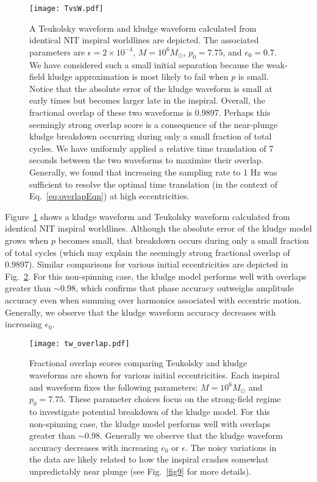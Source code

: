 \documentclass[aps,prd,twocolumn,showpacs,notitlepage,eqsecnum,
superscriptaddress,nofootinbib]{revtex4-1}
\begin{document}
\begin{figure}
\centering
  \vspace{0.2cm}
  \texttt{[image: TvsW.pdf]} 
   \caption{A Teukolsky waveform and kludge waveform calculated from identical NIT inspiral worldlines are depicted. The associated parameters are $\epsilon = 2\times 10^{-4}$, $M = 10^6 M_\odot$, $p_0 = 7.75$, and $e_0 = 0.7$. We have considered such a small initial separation because the weak-field kludge approximation is most likely to fail when $p$ is small. Notice that the absolute error of the kludge waveform is small at early times but becomes larger late in the inspiral. Overall, the fractional overlap of these two waveforms is 0.9897. Perhaps this seemingly strong overlap score is a consequence of the near-plunge kludge breakdown occurring during only a small fraction of total cycles. We have uniformly applied a relative time translation of 7 seconds between the two waveforms to maximize their overlap. Generally, we found that increasing the sampling rate to 1 Hz was sufficient to resolve the optimal time translation (in the context of Eq.~\eqref{eq:overlapEqn}) at high eccentricities.}
  \label{fig:TvsW}
\end{figure}

Figure~\ref{fig:TvsW} shows a kludge waveform and Teukolsky waveform calculated from identical NIT inspiral worldlines. Although the absolute error of the kludge model grows when $p$ becomes small, that breakdown occurs during only a small fraction of total cycles (which may explain the seemingly strong fractional overlap of 0.9897). Similar comparisons for various initial eccentricities are depicted in Fig.~\ref{fig:tw_overlap}. For this non-spinning case, the kludge model performs well with overlaps greater than $\sim 0.98$, which confirms that phase accuracy outweighs amplitude accuracy even when summing over harmonics associated with eccentric motion. Generally, we observe that the kludge waveform accuracy decreases with increasing $e_0$.

\begin{figure}
\centering
  \vspace{0.2cm}
  \texttt{[image: tw\_overlap.pdf]} 
   \caption{Fractional overlap scores comparing Teukolsky and kludge waveforms are shown for various initial eccentricities. Each inspiral and waveform fixes the following parameters: $M = 10^6 M_\odot$ and $p_0 = 7.75$. These parameter choices focus on the strong-field regime to investigate potential breakdown of the kludge model. For this non-spinning case, the kludge model performs well with overlaps greater than $\sim 0.98$. Generally we observe that the kludge waveform accuracy decreases with increasing $e_0$ or $\epsilon$. The noisy variations in the data are likely related to how the inspiral crashes somewhat unpredictably near plunge (see Fig.~\ref{fig9} for more details).}
  \label{fig:tw_overlap}
\end{figure}
\end{document}
